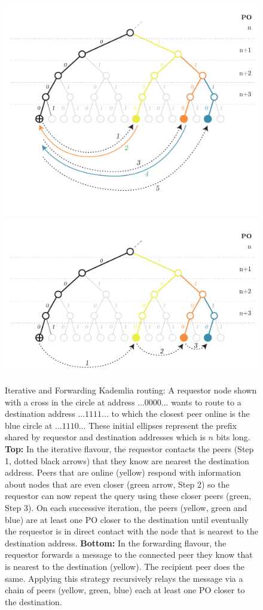 \begin{figure}[p]
   \centering
   \vspace{-0.5cm} 
   \includegraphics[width=.8\textwidth]{fig/iterative-kademlia_new.pdf}\\\vspace{-1.3cm}
   \includegraphics[width=.8\textwidth]{fig/forwarding-kademlia-3_new.pdf}
   \caption[Iterative and Forwarding Kademlia routing \statusgreen]{Iterative and Forwarding Kademlia routing: A requestor node shown with a cross in the circle at address $...0000...$ wants to route to a destination address $...1111...$ to which the closest peer online is the blue circle at $...1110...$ These initial ellipses represent the prefix shared by requestor and destination addresses which is $n$ bits long. \textbf{Top:} In the iterative flavour, the requestor contacts the peers (Step 1, dotted black arrows) that they know are nearest the destination address. Peers that are online (yellow) respond with information about nodes that are even closer (green arrow, Step 2) so the requestor can now repeat the query using these closer peers (green, Step 3). On each successive iteration, the peers (yellow, green and blue) are at least one PO closer to the destination until eventually the requestor is in direct contact with the node that is nearest to the destination address. \textbf{Bottom:} In the forwarding flavour, the requestor forwards a message to the connected peer they know that is nearest to the destination (yellow). The recipient peer does the same. Applying this strategy recursively relays the message via a chain of peers (yellow, green, blue) each at least one PO closer to the destination.}
   \label{fig:iterative-forwarding-kademlia}
\end{figure}


